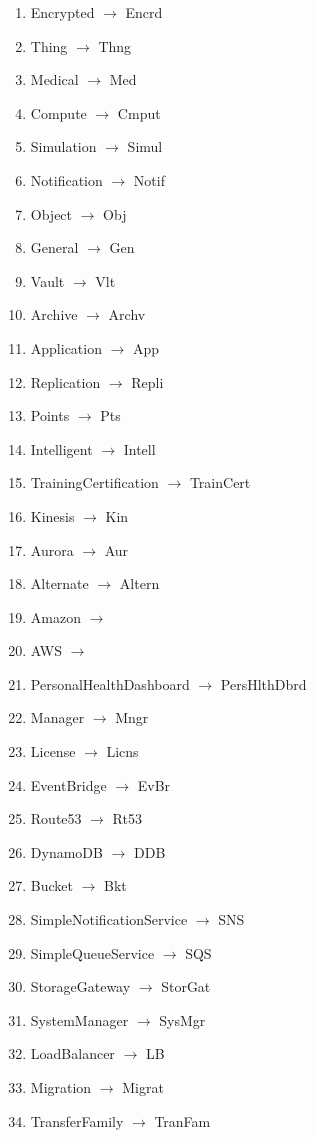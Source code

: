 \documentclass[12pt]{article}
\begin{document}
{\begin{multicols}{3}
\begin{enumerate}
  \item	Encrypted $\rightarrow$ Encrd
  \item	Thing $\rightarrow$ Thng
  \item	Medical $\rightarrow$ Med
  \item	Compute $\rightarrow$ Cmput
  \item	Simulation $\rightarrow$ Simul
  \item	Notification $\rightarrow$ Notif
  \item	Object $\rightarrow$ Obj
  \item	General $\rightarrow$ Gen
  \item	Vault $\rightarrow$ Vlt
  \item	Archive $\rightarrow$ Archv
  \item	Application $\rightarrow$ App
  \item	Replication $\rightarrow$ Repli
  \item	Points $\rightarrow$ Pts
  \item	Intelligent $\rightarrow$ Intell
  \item	TrainingCertification $\rightarrow$ TrainCert
  \item	Kinesis $\rightarrow$ Kin
  \item	Aurora $\rightarrow$ Aur
  \item	Alternate $\rightarrow$ Altern
  \item	Amazon $\rightarrow$ 
  \item	AWS $\rightarrow$ 
  \item	PersonalHealthDashboard $\rightarrow$ PersHlthDbrd
  \item	Manager $\rightarrow$ Mngr
  \item	License $\rightarrow$ Licns
  \item	EventBridge $\rightarrow$ EvBr
  \item	Route53 $\rightarrow$ Rt53
  \item	DynamoDB $\rightarrow$ DDB
  \item	Bucket $\rightarrow$ Bkt
  \item	SimpleNotificationService $\rightarrow$ SNS
  \item	SimpleQueueService $\rightarrow$ SQS
  \item	StorageGateway $\rightarrow$ StorGat
  \item	SystemManager $\rightarrow$ SysMgr
  \item	LoadBalancer $\rightarrow$ LB
  \item	Migration $\rightarrow$ Migrat
  \item	TransferFamily $\rightarrow$ TranFam

\end{enumerate}
\end{multicols}}
\end{document}
